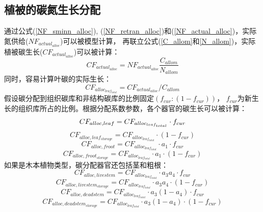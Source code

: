 \subsection{植被的碳氮生长分配}\label{植被的碳氮生长分配}
通过公式(\ref{NF_sminn_alloc}), (\ref{NF_retran_alloc})和(\ref{NF_actual_alloc})，实际氮供给($NF_{actual_{alloc}}$)可以被模型计算，
再联立公式(\ref{C_allom}和\ref{N_allom})，实际植被碳生长($CF_{actual_{alloc}}$)可以被计算：
\begin{equation}
  CF_{actual_{alloc}}=NF_{actual_{alloc}}\frac{C_{allom}}{N_{allom}}
\end{equation}
同时，容易计算叶碳的实际生长：
\begin{equation}
  CF_{alloc_{leaf_{total}}}=CF_{actual_{alloc}}/C_{allom}
\end{equation}
假设碳分配到组织碳库和非结构碳库的比例固定$\left(f_{cur}:\left(1-f_{cur}\right)\right)$，
$f_{cur}$为新生长的组织库所占的比例。根据分配系数参数，各个器官的碳生长可以被计算：
\begin{equation}\label{CF_alloc_{leaf}}
  CF_{alloc,leaf}=CF_{alloc_{leaf_{total}}}\cdot  f_{cur}
\end{equation}
\begin{equation}
  CF_{alloc,leaf_{storage}}=CF_{alloc_{leaf_{total}}}\cdot \left(1-f_{cur}\right)
\end{equation}
\begin{equation}
  CF_{alloc,froot}=CF_{alloc_{leaf_{total}}}\cdot a_1\cdot f_{cur}
\end{equation}
\begin{equation}
  CF_{alloc,{froot_{storage}}}=CF_{alloc_{leaf_{total}}}\cdot a_1\cdot \left(1-f_{cur}\right)
\end{equation}
如果是木本植物类型，碳分配器官还包括茎和粗根：
\begin{equation}
  CF_{alloc,livestem}=CF_{alloc_{leaf_{total}}}\cdot a_3a_4\cdot f_{cur}
\end{equation}
\begin{equation}
  CF_{alloc,livestem_{storage}}=CF_{alloc_{leaf_{total}}}\cdot a_3a_4\cdot \left(1-f_{cur}\right)
\end{equation}
\begin{equation}
  CF_{alloc,deadstem}=CF_{alloc_{leaf_{total}}}\cdot a_3\left(1-a_4\right)\cdot f_{cur}
\end{equation}
\begin{equation}
  CF_{alloc,deadstem_{storage}}=CF_{alloc_{leaf_{total}}}\cdot a_3\left(1-a_4\right)\cdot \left(1-f_{cur}\right)
\end{equation}
